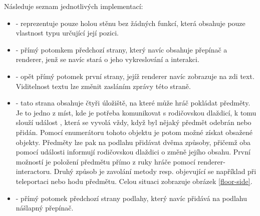 Následuje seznam jednotlivých implementací:
\begin{itemize}

\item {} - reprezentuje pouze holou stěnu bez žádných funkcí, která obsahuje
	pouze vlastnost typu  určující její pozici. 

\item {} - přímý potomkem předchozí strany, který navíc obsahuje přepínač a renderer, 
	jenž se navíc stará o jeho vykreslování a interakci. 

\item {} - opět přímý potomek první strany, jejíž renderer navíc zobrazuje na zdi text. Viditelnost textu lze změnit zasláním zprávy
	této straně. 

\item {} - tato strana obsahuje čtyři úložiště,
na které může hráč pokládat předměty. Je to jedno z míst, kde je potřeba komunikovat s rodičovskou dlaždicí, k tomu
slouží událost , která se vyvolá vždy, když byl nějaký předmět odebrán nebo přidán.
Pomocí enumerátoru tohoto objektu je potom možné získat obsažené objekty. Předměty lze pak na podlahu přidávat dvěma 
způsoby, přičemž oba pomocí události informují rodičovskou dlaždici o změně jejího obsahu. První možností je položení 
předmětu přímo z ruky hráče pomocí renderer-interactoru. Druhý způsob je zavolání metody  resp.  
objevující se například při teleportaci nebo hodu předmětu. Celou situaci zobrazuje obrázek \ref{floor-side}.

\item {} - přímý potomek předchozí strany podlahy, který navíc přidává na podlahu nášlapný přepínač.

\end{itemize}

